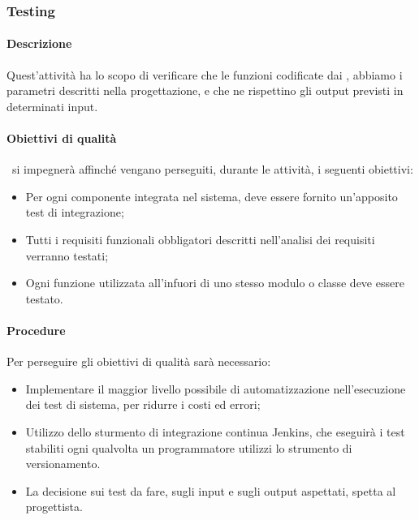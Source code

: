 \documentclass[../NormeDiProgetto_v4.0.0.tex]{subfiles}
\begin{document}
		\subsubsection{Testing}
		\paragraph{Descrizione}
			Quest'attività ha lo scopo di verificare che le funzioni codificate dai \programmatori, abbiamo i parametri descritti nella progettazione, e che ne rispettino gli output previsti in determinati input.

		\paragraph{Obiettivi di qualità}
			\kpanic\ si impegnerà affinché vengano perseguiti, durante le attività, i seguenti obiettivi:
			\begin{itemize}
				\item Per ogni componente integrata nel sistema, deve essere fornito un'apposito test di integrazione;
				\item Tutti i requisiti funzionali obbligatori descritti nell'analisi dei requisiti verranno testati;
				\item Ogni funzione utilizzata all'infuori di uno stesso modulo o classe deve essere testato.
			\end{itemize}
				
		\paragraph{Procedure}
			Per perseguire gli obiettivi di qualità sarà necessario:
			\begin{itemize}
				\item Implementare il maggior livello possibile di automatizzazione nell'esecuzione dei test di sistema, per ridurre i costi ed errori;
				\item Utilizzo dello sturmento di integrazione continua Jenkins, che eseguirà i test stabiliti ogni qualvolta un programmatore utilizzi lo strumento di versionamento.
				\item La decisione sui test da fare, sugli input e sugli output aspettati, spetta al progettista.
			\end{itemize}
\end{document}
